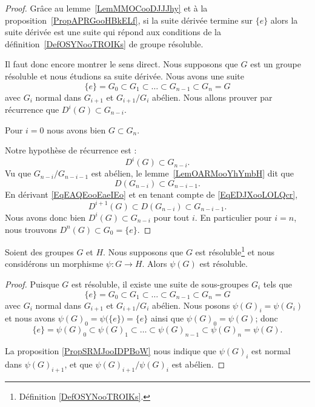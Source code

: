 \begin{proof}
	Grâce au lemme~\ref{LemMMOCooDJJJhy} et à la proposition~\ref{PropAPRGooHBkELf}, si la suite dérivée termine sur \( \{ e \}\) alors la suite dérivée est une suite qui répond aux conditions de la définition~\ref{DefOSYNooTROIKs} de groupe résoluble.

	Il faut donc encore montrer le sens direct. Nous supposons que \( G\) est un groupe résoluble et nous étudions sa suite dérivée. Nous avons une suite
	\begin{equation}
        \{ e \}=G_0\subset G_1\subset\ldots\subset G_{n-1}\subset G_n=G
	\end{equation}
    avec \( G_{i}\) normal dans \( G_{i+1}\) et \( G_{i+1}/G_i\) abélien. Nous allons prouver par récurrence que \( D^i(G)\subset G_{n-i}\).

	Pour \( i=0\) nous avons bien \( G\subset G_n\). 

    Notre hypothèse de récurrence est :
	\begin{equation}    \label{EqEAQEooEaeIEo}
        D^i(G)\subset G_{n-i}.
	\end{equation}
    Vu que \( G_{n-i}/G_{n-i-1}\) est abélien, le lemme~\ref{LemOARMooYhYmbH} dit que
	\begin{equation}    \label{EqEDJXooLOLQcr}
        D(G_{n-i})\subset G_{n-i-1}.
	\end{equation}
	En dérivant \eqref{EqEAQEooEaeIEo} et en tenant compte de \eqref{EqEDJXooLOLQcr}, 
    \begin{equation}
        D^{i+1}(G)\subset D(G_{n-i})\subset G_{n-i-1}.
    \end{equation}
    Nous avons donc bien \( D^i(G)\subset G_{n-i}\) pour tout \( i\). En particulier pour \( i=n\), nous trouvons \( D^n(G)\subset G_0=\{ e \}\).
\end{proof}

\begin{proposition} \label{PropBNEZooJMDFIB}
    Soient des groupes \( G\) et \( H\). Nous supposons que \( G\) est résoluble\footnote{Définition \ref{DefOSYNooTROIKs}.} et nous considérons un morphisme \( \psi\colon G\to H\). Alors \( \psi(G)\) est résoluble.
\end{proposition}

\begin{proof}
	Puisque \( G\) est résoluble, il existe une suite de sous-groupes \( G_i\) tels que
	\begin{equation}
        \{ e \}=G_0\subset G_1\subset\ldots\subset G_{n-1}\subset G_n=G
	\end{equation}
    avec \( G_{i}\) normal dans \( G_{i+1}\) et \( G_{i+1}/G_i\) abélien. Nous posons \( \psi(G)_i=\psi(G_i)\) et nous avons \( \psi(G)_0=\psi\big( \{ e \} \big)=\{ e \}\) ainsi que \( \psi(G)_0=\psi(G)\); donc
	\begin{equation}
        \{ e \}=\psi(G)_0\subset \psi(G)_{1}\subset\ldots\subset \psi(G)_{n-1}\subset \psi(G)_n=\psi(G).
	\end{equation}

    La proposition \ref{PropSRMJooIDPBoW} nous indique que \( \psi(G)_i\) est normal dans \( \psi(G)_{i+1}\), et que \( \psi(G)_{i+1}/\psi(G)_{i}\) est abélien.
\end{proof}


